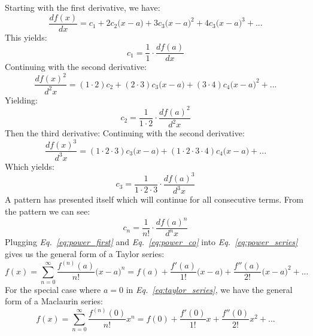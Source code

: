 \vspace{0.5cm}
\noindent
Starting with the first derivative, we have:
    \begin{equation*}
        \frac{df(x)}{dx} = c_1 + 2c_2{\big(x - a\big)} + 3c_3{\big(x - a\big)}^2
        + 4c_3{\big(x - a\big)}^3 + ...
    \end{equation*}
This yields:
    \begin{equation*}
        c_1 = \frac{1}{1} \cdot \frac{df(a)}{dx}
    \end{equation*}
Continuing with the second derivative:
    \begin{equation*}
        \frac{{df(x)}^2}{d^2x} = (1 \cdot 2)c_2 + (2 \cdot 3)c_3{\big(x - a\big)} + (3 \cdot 4)c_4{\big(x - a\big)}^2
        + ...
    \end{equation*}
Yielding:
    \begin{equation*}
        c_2 = \frac{1}{1 \cdot 2} \cdot \frac{{df(a)}^2}{d^2x}
    \end{equation*}
Then the third derivative:
Continuing with the second derivative:
    \begin{equation*}
        \frac{{df(x)}^3}{d^3x} = (1 \cdot 2 \cdot 3)c_3{\big(x - a\big)}
        + (1 \cdot 2 \cdot 3 \cdot 4)c_4{\big(x - a\big)} + ...
    \end{equation*}
Which yields:
    \begin{equation*}
        c_3 = \frac{1}{1 \cdot 2 \cdot 3} \cdot \frac{{df(a)}^3}{d^3x}
    \end{equation*}
A pattern has presented itself which will continue for all consecutive terms.  From the pattern we can see:
    \begin{equation}
        c_n = \frac{1}{n!} \cdot \frac{{df(a)}^n}{d^nx}
        \label{eq:power_co}
    \end{equation}
Plugging \emph{Eq.~\ref{eq:power_first}} and \emph{Eq.~\ref{eq:power_co}} into \emph{Eq.~\ref{eq:power_series}} gives us the general form of a Taylor series:
    \begin{equation}
        f(x) = \sum_{n=0}^{\infty}\frac{f^{(n)}(a)}{n!}{\big(x - a\big)}^n = f(a)
        + \frac{f'(a)}{1!}{\big(x - a\big)} + \frac{f''(a)}{2!}{\big(x - a\big)}^2 + ...
        \label{eq:taylor_series}
    \end{equation}
For the special case where $a = 0$ in \emph{Eq.~\ref{eq:taylor_series}}, we have the general form of a Maclaurin series:
    \begin{equation}
        f(x) = \sum_{n=0}^{\infty}\frac{f^{(n)}(0)}{n!}{x}^n = f(0)
        + \frac{f'(0)}{1!}{x} + \frac{f''(0)}{2!}{x}^2 + ...
        \label{eq:maclaurin_series}
    \end{equation}
